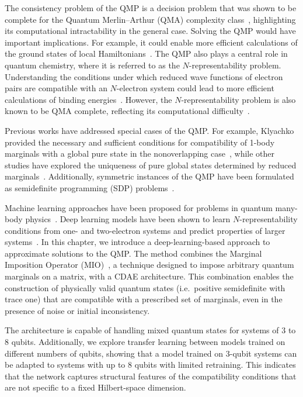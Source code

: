 The consistency problem of the QMP is a decision problem that was shown to be complete for the Quantum Merlin--Arthur (QMA) complexity class~\cite{liu2006consistency, broadbent2022qma}, highlighting its computational intractability in the general case. Solving the QMP would have important implications. For example, it could enable more efficient calculations of the ground states of local Hamiltonians~\cite{liu2007nrep}. The QMP also plays a central role in quantum chemistry, where it is referred to as the $N$-representability problem. Understanding the conditions under which reduced wave functions of electron pairs are compatible with an $N$-electron system could lead to more efficient calculations of binding energies~\cite{judd2001coulson}. However, the $N$-representability problem is also known to be QMA complete, reflecting its computational difficulty~\cite{liu2007nrep}.

Previous works have addressed special cases of the QMP. For example, Klyachko provided the necessary and sufficient conditions for compatibility of 1-body marginals with a global pure state in the nonoverlapping case~\cite{klyachko2004}, while other studies have explored the uniqueness of pure global states determined by reduced marginals~\cite{linden2002, diosi2004, wyderka2017}. Additionally, symmetric instances of the QMP have been formulated as semidefinite programming (SDP) problems~\cite{aloy2020}.

Machine learning approaches have been proposed for problems in quantum many-body physics~\cite{carleo2017, carleo2019, huang2022provably, requena2023}. Deep learning models have been shown to learn $N$-representability conditions from one- and two-electron systems and predict properties of larger systems~\cite{sagersmith2022, delgadogranados2025, shao2023}. In this chapter, we introduce a deep-learning-based approach to approximate solutions to the QMP. The method combines the Marginal Imposition Operator (MIO)~\cite{uzcategui2022mio}, a technique designed to impose arbitrary quantum marginals on a matrix, with a CDAE architecture. This combination enables the construction of physically valid quantum states (i.e.\ positive semidefinite with trace one) that are compatible with a prescribed set of marginals, even in the presence of noise or initial inconsistency.

The architecture is capable of handling mixed quantum states for systems of 3 to 8 qubits. Additionally, we explore transfer learning between models trained on different numbers of qubits, showing that a model trained on 3-qubit systems can be adapted to systems with up to 8 qubits with limited retraining. This indicates that the network captures structural features of the compatibility conditions that are not specific to a fixed Hilbert-space dimension.

